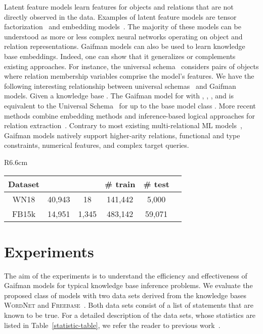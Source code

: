 \documentclass{article}
\begin{document}
Latent feature models learn features for objects and relations that are not directly observed in the data. Examples of latent feature models are tensor factorization~\cite{nickel:2011,riedel13relation,Socher:2013} and embedding models~\cite{Bordes:2011,bordes:2012,Bordes:2013,lin:2015,DBLP:conf/aaai/JiLH016,DBLP:conf/icml/TrouillonWRGB16}. The majority of these models can be understood as more or less complex neural networks operating on object and relation representations. Gaifman models can also be used to learn knowledge base embeddings. Indeed, one can show that it generalizes or complements existing approaches. For instance, the universal schema~\cite{riedel13relation} considers pairs of objects where relation membership variables comprise the model's features. We have the following interesting relationship between universal schemas~\cite{riedel13relation} and Gaifman models. Given a knowledge base . The Gaifman model for  with , , ,  and  is equivalent to the Universal Schema~\cite{riedel13relation} for  up to the base model class .  
More recent methods combine embedding methods and inference-based logical approaches for relation extraction~\cite{logicmf:naacl15}. Contrary to most existing multi-relational ML models~\cite{Nickel:2016}, Gaifman models natively support higher-arity relations, functional and type constraints, numerical features, and complex target queries. 




\begin{wraptable}[5]{R}{6.6cm}
\vspace{-5mm}
\small
\caption{\label{statistic-table} The statistics of the data sets.}
\begin{tabular}{|c|c|c|c|c|c|}
\hline 
Dataset &  &  & \# train & \# test \\ 
\hline 
WN18 & 40,943 & 18 & 141,442 &  5,000 \\ 
FB15k & 14,951 & 1,345 & 483,142 &  59,071 \\ 
\hline 
\end{tabular}
\end{wraptable}
\normalsize





\section{Experiments}

The aim of the experiments is to understand the efficiency and effectiveness of Gaifman models for typical knowledge base inference problems. 
We evaluate the proposed class of models with two data sets derived from the knowledge bases \textsc{WordNet} and \textsc{Freebase}~\cite{Bollacker:2008}. Both data sets consist of a list of statements  that are known to be true.  For a detailed description of the data sets, whose statistics are listed in Table~\ref{statistic-table},  we refer the reader to previous work~\cite{Bordes:2013}.  
\end{document}
